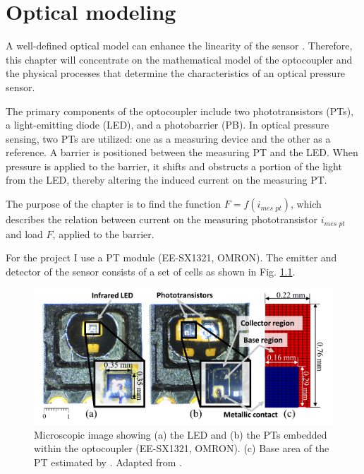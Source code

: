 \chapter{Optical modeling}
\label{chapter:optical_modeling}
A well-defined optical model can enhance the linearity of the sensor \cite{my_love_pressure_photosensor}. Therefore, this chapter will concentrate on the mathematical model of the optocoupler and the physical processes that determine the characteristics of an optical pressure sensor.

The primary components of the optocoupler include two phototransistors (PTs), a light-emitting diode (LED), and a photobarrier (PB). 
In optical pressure sensing, two PTs are utilized: one as a measuring device and the other as a reference. 
A barrier is positioned between the measuring PT and the LED. 
When pressure is applied to the barrier, it shifts and obstructs a portion of the light from the LED, thereby altering the induced current on the measuring PT.

The purpose of the chapter is to find the function $F = f(i_{\textit{mes pt}})$, which describes the relation between current on the measuring phototransistor $i_{\textit{mes pt}}$ and load $F$, applied to the barrier.

For the project I use a PT module (EE-SX1321, OMRON). 
The emitter and detector of the sensor consists of a set of cells as shown in Fig. \ref*{fig:microscopic_image}.

\begin{figure}[H]
  \includegraphics[width=\textwidth]{figs/Microscopic_image.png}
    \centering
    \caption{ Microscopic image showing (a) the LED and (b) the PTs embedded within the optocoupler (EE-SX1321, OMRON). 
    (c) Base area of the PT estimated by \cite[Fig. 4]{my_love_pressure_photosensor}.
    Adapted from \cite[Fig. 4]{my_love_pressure_photosensor}.}
    \label{fig:microscopic_image}
\end{figure}


